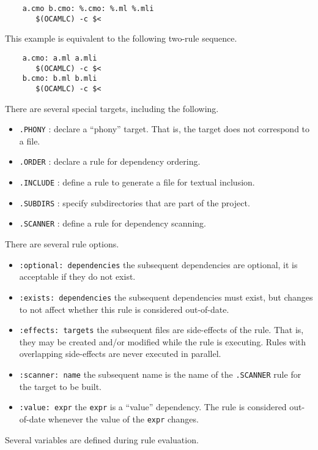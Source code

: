\begin{verbatim}
    a.cmo b.cmo: %.cmo: %.ml %.mli
       $(OCAMLC) -c $<
\end{verbatim}

This example is equivalent to the following two-rule sequence.

\begin{verbatim}
    a.cmo: a.ml a.mli
       $(OCAMLC) -c $<
    b.cmo: b.ml b.mli
       $(OCAMLC) -c $<
\end{verbatim}

There are several special targets, including the following.

\begin{itemize}
\item \verb+.PHONY+ : declare a ``phony'' target.  That is, the target does not correspond to a file.
\item \verb+.ORDER+ : declare a rule for dependency ordering.
\item \verb+.INCLUDE+ : define a rule to generate a file for textual inclusion.
\item \verb+.SUBDIRS+ : specify subdirectories that are part of the project.
\item \verb+.SCANNER+ : define a rule for dependency scanning.
\end{itemize}

There are several rule options.

\begin{itemize}
\item \verb+:optional: dependencies+ the subsequent dependencies are optional, it is acceptable if they do not exist.
\item \verb+:exists: dependencies+ the subsequent dependencies must exist, but changes to not affect
whether this rule is considered out-of-date.
\item \verb+:effects: targets+ the subsequent files are side-effects of the rule.  That is, they may be
created and/or modified while the rule is executing.  Rules with overlapping side-effects are never
executed in parallel.
\item \verb+:scanner: name+ the subsequent name is the name of the \verb+.SCANNER+ rule for the target to be built.
\item \verb+:value: expr+ the \verb+expr+ is a ``value'' dependency.  The rule is considered
out-of-date whenever the value of the \verb+expr+ changes.
\end{itemize}

Several variables are defined during rule evaluation.

